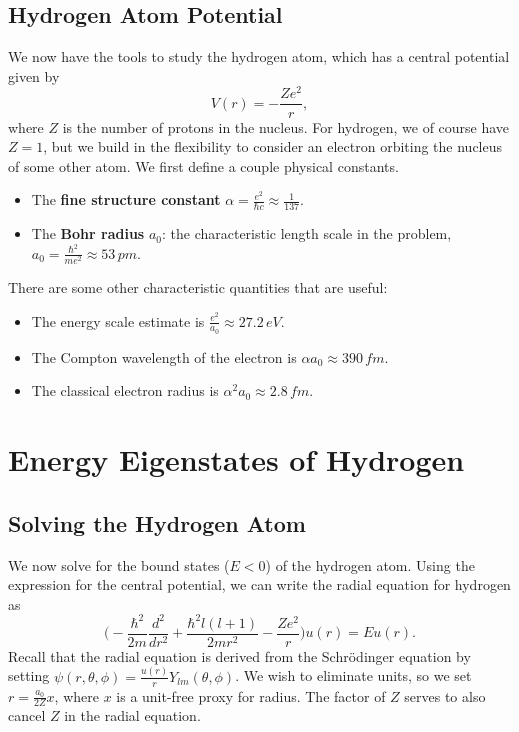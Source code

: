 \subsection{Hydrogen Atom Potential}

We now have the tools to study the hydrogen atom, which has a central potential given by $$\boxed{V(r)=-\frac{Ze^2}{r},}$$where $Z$ is the number of protons in the nucleus. For hydrogen, we of course have $Z=1$, but we build in the flexibility to consider an electron orbiting the nucleus of some other atom. We first define a couple physical constants.

\begin{itemize}
    \item The \textbf{fine structure constant} $\alpha=\frac{e^2}{\hbar c}\approx\frac{1}{137}$.
    \item The \textbf{Bohr radius} $a_0$: the characteristic length scale in the problem, $a_0=\frac{\hbar^2}{me^2}\approx 53\,pm$.
\end{itemize}

There are some other characteristic quantities that are useful:

\begin{itemize}
    \item The energy scale estimate is $\frac{e^2}{a_0}\approx 27.2\,eV$.
    \item The Compton wavelength of the electron is $\alpha a_0\approx 390\,fm$.
    \item The classical electron radius is $\alpha^2 a_0\approx 2.8\,fm$.
\end{itemize}

\section{Energy Eigenstates of Hydrogen}
\subsection{Solving the Hydrogen Atom}\label{solving_hydrogen_atom}

We now solve for the bound states ($E<0$) of the hydrogen atom. Using the expression for the central potential, we can write the radial equation for hydrogen as $$\bigg(-\frac{\hbar^2}{2m}\frac{d^2}{dr^2}+\frac{\hbar^2l(l+1)}{2mr^2}-\frac{Ze^2}{r}\bigg)u(r)=Eu(r).$$Recall that the radial equation is derived from the Schrödinger equation by setting $\psi(r,\theta,\phi)=\frac{u(r)}{r}Y_{lm}(\theta,\phi)$. We wish to eliminate units, so we set $r=\frac{a_0}{2Z}x$, where $x$ is a unit-free proxy for radius. The factor of $Z$ serves to also cancel $Z$ in the radial equation.

